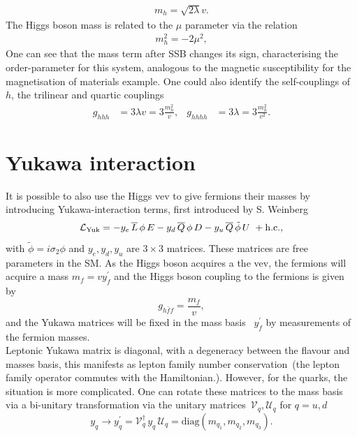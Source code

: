 \begin{align}
  m_h =\sqrt{2 \lambda} v .
\end{align}
The  Higgs boson mass is related to the $\mu$ parameter via the relation
\begin{align}
	m_h ^2 =-2 \mu^2,
\end{align}
One can see that the mass term after SSB changes its sign, characterising the order-parameter for this system,  analogous to the magnetic susceptibility for the magnetisation of materials example. 
One could also identify the self-couplings of~$h$, the trilinear and quartic couplings 
\begin{align}
    g_{hhh}&=3\lambda v =3\frac{m_h^2}{v}, & g_{hhhh}&= 3 \lambda = 3\frac{m_h^2}{v^2}.
\end{align}
\section{Yukawa interaction \label{smyukawa}}
It is possible to also use the Higgs vev to give fermions their masses by introducing  Yukawa-interaction terms, first introduced by S. Weinberg~\cite{PhysRevLett.19.1264}
\begin{equation}
    \mathcal{L}_{\mathrm{Yuk}}= -y_{e} \, \overline{L} \, \phi \, E 
- y_{d} \, \overline{Q} \, \phi \, D
- y_u \, \overline{Q} \, \tilde{\phi} \, U   \ + \mathrm{h.c.},
\label{lag-yuk}
\end{equation}
with $ \tilde{\phi}= i\sigma_2 \phi$ and $ y_e, y_d, y_u$ are $3\times 3$ matrices. These matrices are free parameters in the SM. As the Higgs boson acquires a the vev, the fermions will acquire a mass $m_f= vy^\prime_f$ and the Higgs boson coupling to the fermions is given by
\begin{equation}
	g_{h\bar{f}f} = \frac{m_f}{v},
\end{equation}
 and the Yukawa matrices will be fixed in the mass basis ~$y^\prime_f$ by measurements of the fermion masses.\\  Leptonic Yukawa matrix is diagonal, with a degeneracy between the flavour and masses basis, this manifests as lepton family number conservation~(the lepton family operator commutes with the Hamiltonian.). However, for the quarks, the situation is more complicated. One can rotate these matrices to the mass basis via a bi-unitary transformation via the unitary matrices~$ \mathcal{V}_q, \mathcal{U}_q$ for $ q= u,d$
\begin{equation}
    y_{q} \longrightarrow y^\prime_q= \mathcal{V}^\dagger_{q} \,y_q\, \mathcal{U}_{q} = \text{diag}\left(m_{q_1}, m_{q_2},m_{q_3}\right).
\end{equation}
